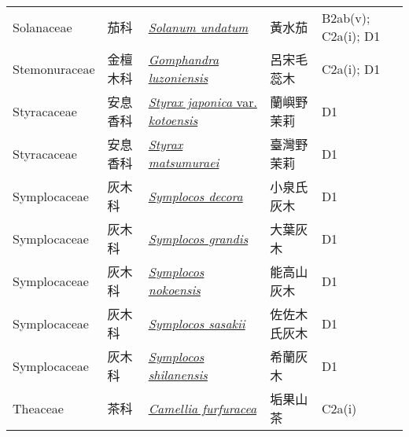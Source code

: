{\begin{longtable}{p{2.5cm}p{2.5cm}p{4.5cm}p{2.5cm}p{3cm}}
    Solanaceae & 茄科 & \href{http://www.theplantlist.org/tpl1.1/search?q=Solanum+undatum}{\textit{Solanum undatum} } & 黃水茄 & B2ab(v); C2a(i); D1 \index{Solanum@\textit{Solanum}!undatum@\textit{undatum}}  \index{黃水茄} \\
    Stemonuraceae & 金檀木科 & \href{http://www.theplantlist.org/tpl1.1/search?q=Gomphandra+luzoniensis}{\textit{Gomphandra luzoniensis} } & 呂宋毛蕊木 & C2a(i); D1 \index{Gomphandra@\textit{Gomphandra}!luzoniensis@\textit{luzoniensis}}  \index{呂宋毛蕊木} \\
    Styracaceae & 安息香科 & \href{http://www.theplantlist.org/tpl1.1/search?q=Styrax+japonica+var.+kotoensis}{\textit{Styrax japonica} var. \textit{kotoensis} } & 蘭嶼野茉莉 & D1 \index{Styrax@\textit{Styrax}!japonica@\textit{japonica}!var. kotoensis@var. \textit{kotoensis}}  \index{蘭嶼野茉莉} \\
    Styracaceae & 安息香科 & \href{http://www.theplantlist.org/tpl1.1/search?q=Styrax+matsumuraei}{\textit{Styrax matsumuraei} } & 臺灣野茉莉 & D1 \index{Styrax@\textit{Styrax}!matsumuraei@\textit{matsumuraei}}  \index{臺灣野茉莉} \\
    Symplocaceae & 灰木科 & \href{http://www.theplantlist.org/tpl1.1/search?q=Symplocos+decora}{\textit{Symplocos decora} } & 小泉氏灰木 & D1 \index{Symplocos@\textit{Symplocos}!decora@\textit{decora}}  \index{小泉氏灰木} \\
    Symplocaceae & 灰木科 & \href{http://www.theplantlist.org/tpl1.1/search?q=Symplocos+grandis}{\textit{Symplocos grandis} } & 大葉灰木 & D1 \index{Symplocos@\textit{Symplocos}!grandis@\textit{grandis}}  \index{大葉灰木} \\
    Symplocaceae & 灰木科 & \href{http://www.theplantlist.org/tpl1.1/search?q=Symplocos+nokoensis}{\textit{Symplocos nokoensis} } & 能高山灰木 & D1 \index{Symplocos@\textit{Symplocos}!nokoensis@\textit{nokoensis}}  \index{能高山灰木} \\
    Symplocaceae & 灰木科 & \href{http://www.theplantlist.org/tpl1.1/search?q=Symplocos+sasakii}{\textit{Symplocos sasakii} } & 佐佐木氏灰木 & D1 \index{Symplocos@\textit{Symplocos}!sasakii@\textit{sasakii}}  \index{佐佐木氏灰木} \\
    Symplocaceae & 灰木科 & \href{http://www.theplantlist.org/tpl1.1/search?q=Symplocos+shilanensis}{\textit{Symplocos shilanensis} } & 希蘭灰木 & D1 \index{Symplocos@\textit{Symplocos}!shilanensis@\textit{shilanensis}}  \index{希蘭灰木} \\
    Theaceae & 茶科 & \href{http://www.theplantlist.org/tpl1.1/search?q=Camellia+furfuracea}{\textit{Camellia furfuracea} } & 垢果山茶 & C2a(i) \index{Camellia@\textit{Camellia}!furfuracea@\textit{furfuracea}}  \index{垢果山茶} \\

\end{longtable}}
